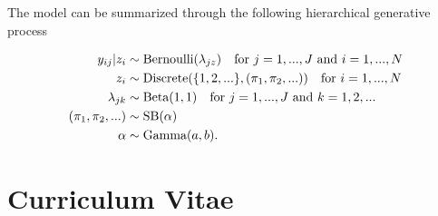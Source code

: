 \documentclass[
  12pt,
]{article}
\begin{document}
The model can be summarized through the following hierarchical
generative process

\begin{align} 
\nonumber y_{ij}|z_i & \sim \text{Bernoulli}(\lambda_{jz}) \hspace{10px} \text{for } j=1,...,J \text{ and } i=1,...,N\\  \nonumber
z_i & \sim \text{Discrete}(\{1,2,...\},(\pi_1,\pi_2,...)) \hspace{10px} \text{for } i=1,...,N \\ \nonumber
\lambda_{jk} & \sim \text{Beta}(1,1) \hspace{10px} \text{for } j=1,...,J \text{ and } k=1,2,... \\ \nonumber
(\pi_1,\pi_2,...) & \sim \text{SB}(\alpha) \\ 
\alpha & \sim \text{Gamma}(a,b).
\end{align}

\newpage

\newpage

\renewcommand{\bibname}{References}


\newpage

\pagestyle{empty}
\section*{Curriculum Vitae}\label{curriculumvitae}
\end{document}
